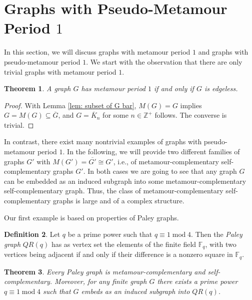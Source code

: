 \documentclass[12pt]{amsart}
\newtheorem{theorem}{Theorem}[section]
\theoremstyle{definition}
\newtheorem{definition}[theorem]{Definition}
\theoremstyle{remark}
\numberwithin{equation}{section}
\numberwithin{figure}{section}
\renewcommand{\mod}{\operatorname{mod}}
\newcommand{\Z}{\mathbb{Z}}
\begin{document}
\section{Graphs with Pseudo-Metamour Period $1$} \label{pseud1}

In this section, we will discuss graphs with metamour period $1$ and graphs with pseudo-metamour period $1$.
We start with the observation that there are only trivial graphs with metamour period $1$.

\begin{theorem}
    A graph $G$ has metamour period $1$ if and only if $G$ is edgeless.
\end{theorem}

\begin{proof}
    With Lemma \ref{lem: subset of G bar}, $M(G)=G$ implies $G = M(G) \subseteq \overline{G}$, and $G=\overline{K}_n$ for some $n\in \Z^+$ follows. The converse is trivial.
\end{proof}

In contrast, there exist many nontrivial examples of graphs with pseudo-metamour period $1$. In the following, we will provide two different families of graphs $G'$ with $M(G')=\overline{G'}\cong G'$, i.e., of metamour-complementary self-complementary graphs $G'$. In both cases we are going to see that any graph $G$ can be embedded as an induced subgraph into some metamour-complementary self-complementary graph. Thus, the class of metamour-complementary self-complementary graphs is large and of a complex structure.

Our first example is based on properties of Paley graphs.

\begin{definition} \label{def: paley}
    Let $q$ be a prime power such that $q\equiv 1 \mod{4}$. Then the \emph{Paley graph} $QR(q)$ has as vertex set the elements of the finite field $\mathbb{F}_q$, with two vertices being adjacent if and only if their difference is a nonzero square in $\mathbb{F}_q$.
\end{definition}

\begin{theorem} \label{thm: paley}
    Every Paley graph is metamour-complementary and self-complementary. Moreover, for any finite graph $G$ there exists a prime power $q\equiv 1 \mod{4}$ such that $G$ embeds as an induced subgraph into $QR(q)$.
\end{theorem}
\end{document}
